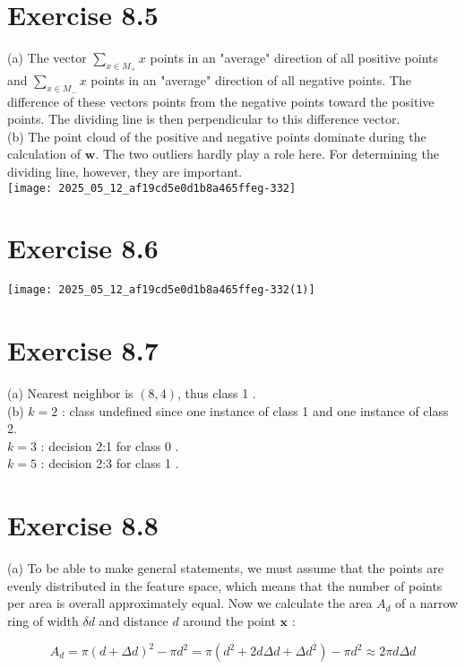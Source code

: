 \documentclass[10pt]{article}
\begin{document}
\section*{Exercise 8.5}
(a) The vector $\sum_{x \in M_{+}} x$ points in an "average" direction of all positive points and $\sum_{x \in M_{-}} x$ points in an "average" direction of all negative points. The difference of these vectors points from the negative points toward the positive points. The dividing line is then perpendicular to this difference vector.\\
(b) The point cloud of the positive and negative points dominate during the calculation of $\boldsymbol{w}$. The two outliers hardly play a role here. For determining the dividing line, however, they are important.\\
\texttt{[image: 2025\_05\_12\_af19cd5e0d1b8a465ffeg-332]}

\section*{Exercise 8.6}
\begin{center}
\texttt{[image: 2025\_05\_12\_af19cd5e0d1b8a465ffeg-332(1)]}
\end{center}

\section*{Exercise 8.7}
(a) Nearest neighbor is $(8,4)$, thus class 1 .\\
(b) $k=2$ : class undefined since one instance of class 1 and one instance of class 2.\\
$k=3$ : decision 2:1 for class 0 .\\
$k=5$ : decision 2:3 for class 1 .

\section*{Exercise 8.8}
(a) To be able to make general statements, we must assume that the points are evenly distributed in the feature space, which means that the number of points per area is overall approximately equal. Now we calculate the area $A_{d}$ of a narrow ring of width $\delta d$ and distance $d$ around the point $\boldsymbol{x}$ :

$$
A_{d}=\pi(d+\Delta d)^{2}-\pi d^{2}=\pi\left(d^{2}+2 d \Delta d+\Delta d^{2}\right)-\pi d^{2} \approx 2 \pi d \Delta d
$$
\end{document}
